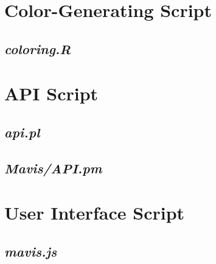 \renewcommand{\appendixname}{Appendix}

\lstset{
basicstyle=\footnotesize\ttfamily,
numbers=left,
numberstyle=\tiny,
stepnumber=2,
numbersep=25pt,
tabsize=2,
extendedchars=true,
breaklines=true,
}

\begin{appendices}

\chapter{Color-Generating Script}
\section*{\emph{coloring.R}}


\chapter{API Script}
\section*{\emph{api.pl}}

\section*{\emph{Mavis/API.pm}}


\chapter{User Interface Script}
\section*{\emph{mavis.js}}


\end{appendices}